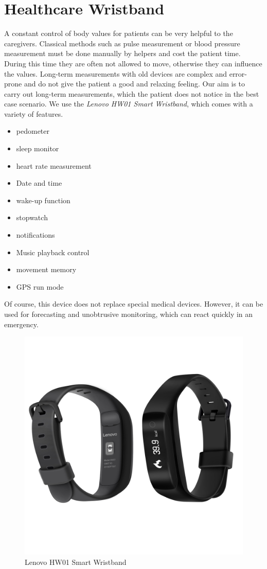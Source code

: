 \section{Healthcare Wristband}
A constant control of body values for patients can be very helpful to the caregivers. Classical methods such as pulse measurement or blood pressure measurement must be done manually by helpers and cost the patient time. During this time they are often not allowed to move, otherwise they can influence the values. Long-term measurements with old devices are complex and error-prone and do not give the patient a good and relaxing feeling. Our aim is to carry out long-term measurements, which the patient does not notice in the best case scenario. We use the \textit{Lenovo HW01 Smart Wristband}, which comes with a variety of features. 
\begin{itemize}
	\item pedometer
	\item sleep monitor
	\item heart rate measurement
	\item Date and time
	\item wake-up function
	\item stopwatch
	\item notifications
	\item Music playback control
	\item movement memory
	\item GPS run mode
\end{itemize}
Of course, this device does not replace special medical devices. However, it can be used for forecasting and unobtrusive monitoring, which can react quickly in an emergency.

\begin{figure}[h]
	\centering
	\includegraphics[width=.5\textwidth, trim=1cm 4cm 2cm 4cm, clip]{images/CostAnalysis/LenovoHW01} 
	\caption{Lenovo HW01 Smart Wristband}
	\label{fig:lenovoHealth}
\end{figure}

